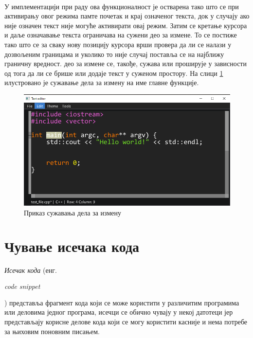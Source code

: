\documentclass[12pt,oneside]{memoir}
\begin{document}
\paragraph{}
У имплементацији при раду ова функционалност је остварена тако што се при
активирању овог режима памте почетак и крај означеног текста, док у случају ако није означен текст није могуће активирати овај режим. Затим се кретање курсора
и даље означавање текста ограничава на сужени део за измене. То се постиже тако што се за сваку нову позицију курсора врши провера да ли се налази у дозвољеним границама и уколико то није случај поставља се на најближу граничну вредност.  део за измене се, такође, сужава или проширује у зависности од тога
да ли се брише или додаје текст у суженом простору. На слици
\ref{fig:edit_narrowing} илустровано је сужавање дела за измену на име главне
функције.

\begin{figure}[!ht]
	\centering
	\includegraphics[width=1.0\textwidth]{images/edit_narrowing.png}
	\caption{Приказ сужавања дела за измену}
	\label{fig:edit_narrowing}
\end{figure}


\section{Чување исечака кода}

\paragraph{}
\emph{Исечак кода} (енг. \begin{latinica}\textit{code snippet}\end{latinica})
представља фрагмент кода који се може користити у различитим програмима или
деловима једног програма, исечци се обично чувају у некој датотеци јер представљају корисне делове кода који се могу користити касније и нема потребе
за њиховим поновним писањем. 
\end{document}
